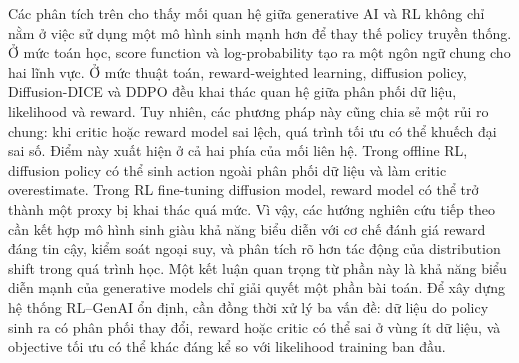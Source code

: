 Các phân tích trên cho thấy mối quan hệ giữa generative AI và RL không chỉ nằm ở việc sử dụng một mô hình sinh mạnh hơn để thay thế policy truyền thống.
Ở mức toán học, score function và log-probability tạo ra một ngôn ngữ chung cho hai lĩnh vực.
Ở mức thuật toán, reward-weighted learning, diffusion policy, Diffusion-DICE và DDPO đều khai thác quan hệ giữa phân phối dữ liệu, likelihood và reward.
Tuy nhiên, các phương pháp này cũng chia sẻ một rủi ro chung: khi critic hoặc reward model sai lệch, quá trình tối ưu có thể khuếch đại sai số.
Điểm này xuất hiện ở cả hai phía của mối liên hệ.
Trong offline RL, diffusion policy có thể sinh action ngoài phân phối dữ liệu và làm critic overestimate.
Trong RL fine-tuning diffusion model, reward model có thể trở thành một proxy bị khai thác quá mức.
Vì vậy, các hướng nghiên cứu tiếp theo cần kết hợp mô hình sinh giàu khả năng biểu diễn với cơ chế đánh giá reward đáng tin cậy, kiểm soát ngoại suy, và phân tích rõ hơn tác động của distribution shift trong quá trình học.
Một kết luận quan trọng từ phần này là khả năng biểu diễn mạnh của generative models chỉ giải quyết một phần bài toán.
Để xây dựng hệ thống RL--GenAI ổn định, cần đồng thời xử lý ba vấn đề: dữ liệu do policy sinh ra có phân phối thay đổi, reward hoặc critic có thể sai ở vùng ít dữ liệu, và objective tối ưu có thể khác đáng kể so với likelihood training ban đầu.
